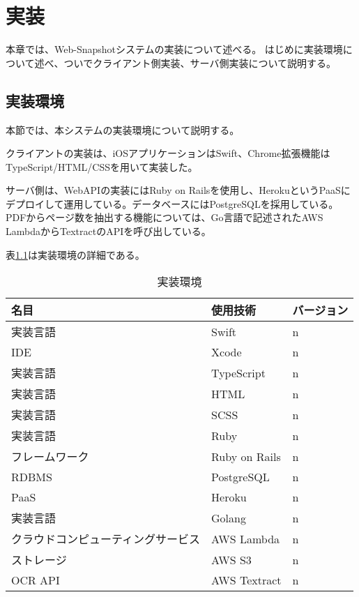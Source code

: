 \chapter{実装}
\label{chap:implementation}
本章では、Web-Snapshotシステムの実装について述べる。
はじめに実装環境について述べ、ついでクライアント側実装、サーバ側実装について説明する。

\section{実装環境}
本節では、本システムの実装環境について説明する。

クライアントの実装は、iOSアプリケーションはSwift、Chrome拡張機能はTypeScript/HTML/CSSを用いて実装した。

サーバ側は、WebAPIの実装にはRuby on Railsを使用し、Heroku\cite{}というPaaSにデプロイして運用している。データベースにはPostgreSQLを採用している。
PDFからページ数を抽出する機能については、Go言語で記述されたAWS LambdaからTextract\cite{}のAPIを呼び出している。

表\ref{tb:implementation-env}は実装環境の詳細である。

\begin{table}[htbp]
  \label{tb:implementation-env}
  \caption{実装環境}
  \begin{center}
    \begin{tabular}{|l|l|l|}
    \hline
    名目 & 使用技術 & バージョン \\ \hline
    実装言語 & Swift & n \\ \hline
    IDE & Xcode & n \\ \hline
    実装言語 & TypeScript & n \\ \hline
    実装言語 & HTML & n \\ \hline
    実装言語 & SCSS & n \\ \hline
    実装言語 & Ruby & n \\ \hline
    フレームワーク & Ruby on Rails & n \\ \hline
    RDBMS & PostgreSQL & n \\ \hline
    PaaS & Heroku & n \\ \hline
    実装言語 & Golang & n \\ \hline
    クラウドコンピューティングサービス & AWS Lambda & n \\ \hline
    ストレージ & AWS S3 & n \\ \hline
    OCR API & AWS Textract & n \\ \hline
    \end{tabular}
  \end{center}
\end{table}

